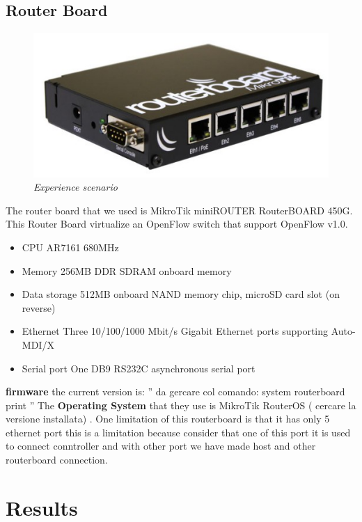 \documentclass[conference,10pt]{IEEEtran}
\begin{document}
  \subsection{Router Board}
  \begin{figure}[!h]
 \centering
 \includegraphics[scale=0.30]{images/rboard.png}
 \caption{\emph{Experience scenario}}
 \label{fig:topo}
  \end{figure}
  
  The router board that we used is MikroTik miniROUTER RouterBOARD 450G. This Router Board virtualize an OpenFlow switch that support
  OpenFlow v1.0\cite{routerboard_doc}.
  \begin{itemize}
   \item CPU		AR7161 680MHz
   \item Memory		256MB DDR SDRAM onboard memory
   \item Data storage	512MB onboard NAND memory chip, microSD card slot (on reverse)
   \item Ethernet 	Three 10/100/1000 Mbit/s Gigabit Ethernet ports supporting Auto-MDI/X
   \item Serial port 	One DB9 RS232C asynchronous serial port
  \end{itemize}
  \textbf{firmware} the current version is: '' da gercare col comando: system routerboard print ''
  \newline
  The \textbf{Operating System} that they use is MikroTik RouterOS ( cercare la versione installata) \cite{routeboard_software}.
  \newline
  One limitation of this routerboard is that it has only 5 ethernet port this is a limitation because consider that one of this port it is
  used to connect conntroller and with other port we have made host and other routerboard connection.


\section{Results}\label{sec:results}
\end{document}
